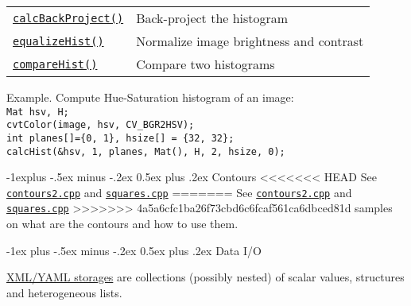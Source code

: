 \documentclass[10pt,landscape]{article}
\makeatletter
\renewcommand{\section}{\@startsection{section}{1}{0mm}%
                                {-1ex plus -.5ex minus -.2ex}%
                                {0.5ex plus .2ex}%
                                {\normalfont\large\bfseries}}
\renewcommand{\subsection}{\@startsection{subsection}{2}{0mm}%
                                {-1explus -.5ex minus -.2ex}%
                                {0.5ex plus .2ex}%
                                {\normalfont\normalsize\bfseries}}
\makeatother
\begin{document}
\begin{multicols}{3}
\begin{tabular}{@{}p{\the\MyLen}%
                @{}p{\linewidth-\the\MyLen}@{}}
\texttt{\href{http://docs.opencv.org/modules/imgproc/doc/histograms.html\#calcbackproject}{calcBackProject()}} & Back-project the histogram \\

\texttt{\href{http://docs.opencv.org/modules/imgproc/doc/histograms.html\#equalizehist}{equalizeHist()}} & Normalize image brightness and contrast\\

\texttt{\href{http://docs.opencv.org/modules/imgproc/doc/histograms.html\#comparehist}{compareHist()}} & Compare two histograms\\

\end{tabular}

\begin{tabbing}
Example. Compute Hue-Saturation histogram of an image:\\
\texttt{Mat hsv, H;}\\
\texttt{cvtColor(image, hsv, CV\_BGR2HSV);}\\
\texttt{int planes[]=\{0, 1\}, hsize[] = \{32, 32\};}\\
\texttt{calcHist(\&hsv, 1, planes, Mat(), H, 2, hsize, 0);}\\
\end{tabbing}

\subsection{Contours}
<<<<<<< HEAD
See \texttt{\href{https://github.com/Itseez/opencv/tree/master/samples/cpp/contours2.cpp}{contours2.cpp}} and \texttt{\href{https://github.com/Itseez/opencv/tree/master/samples/cpp/squares.cpp}{squares.cpp}}
=======
See \texttt{\href{https://github.com/opencv/opencv/tree/master/samples/cpp/contours2.cpp}{contours2.cpp}} and \texttt{\href{https://github.com/opencv/opencv/tree/master/samples/cpp/squares.cpp}{squares.cpp}}
>>>>>>> 4a5a6cfc1ba26f73cbd6c6fcaf561ca6dbced81d
samples on what are the contours and how to use them.

\section{Data I/O}

\href{http://docs.opencv.org/modules/core/doc/xml_yaml_persistence.html\#xml-yaml-file-storages-writing-to-a-file-storage}{XML/YAML storages} are collections (possibly nested) of scalar values, structures and heterogeneous lists.


\end{multicols}
\end{document}
